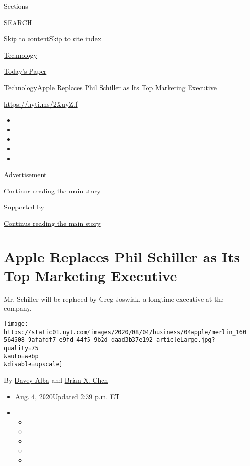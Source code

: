 Sections

SEARCH

\protect\hyperlink{site-content}{Skip to
content}\protect\hyperlink{site-index}{Skip to site index}

\href{https://www.nytimes.com/section/technology}{Technology}

\href{https://myaccount.nytimes.com/auth/login?response_type=cookie\&client_id=vi}{}

\href{https://www.nytimes.com/section/todayspaper}{Today's Paper}

\href{/section/technology}{Technology}\textbar{}Apple Replaces Phil
Schiller as Its Top Marketing Executive

\url{https://nyti.ms/2XuyZtf}

\begin{itemize}
\item
\item
\item
\item
\item
\end{itemize}

Advertisement

\protect\hyperlink{after-top}{Continue reading the main story}

Supported by

\protect\hyperlink{after-sponsor}{Continue reading the main story}

\hypertarget{apple-replaces-phil-schiller-as-its-top-marketing-executive}{%
\section{Apple Replaces Phil Schiller as Its Top Marketing
Executive}\label{apple-replaces-phil-schiller-as-its-top-marketing-executive}}

Mr. Schiller will be replaced by Greg Joswiak, a longtime executive at
the company.

\texttt{[image: https://static01.nyt.com/images/2020/08/04/business/04apple/merlin\_160564608\_9afafdf7-e9fd-44f5-9b2d-daad3b37e192-articleLarge.jpg?quality=75\\\&auto=webp\\\&disable=upscale]}

By \href{https://www.nytimes.com/by/davey-alba}{Davey Alba} and
\href{https://www.nytimes.com/by/brian-x-chen}{Brian X. Chen}

\begin{itemize}
\item
  Aug. 4, 2020Updated 2:39 p.m. ET
\item
  \begin{itemize}
  \item
  \item
  \item
  \item
  \item
  \end{itemize}
\end{itemize}

